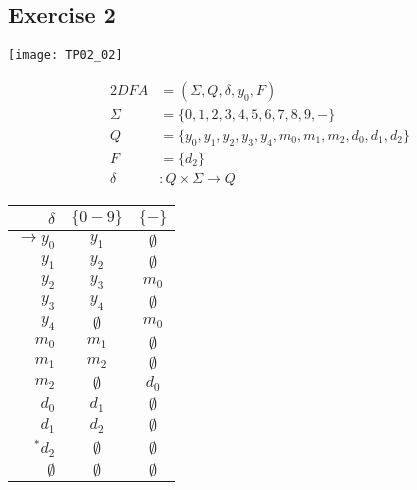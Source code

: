 {\subsection{Exercise 2}
\begin{center} \texttt{[image: TP02\_02]} \end{center}
\begin{center}
	\begin{minipage}[c]{0.50\textwidth}
		\begin{alignat*}{2}
			DFA    &= (\Sigma, Q, \delta, y_0, F)\\
			\Sigma &= \{0,1,2,3,4,5,6,7,8,9,-\}\\
			Q      &= \{y_0,y_1,y_2,y_3,y_4,m_0,m_1,m_2,d_0,d_1,d_2\}\\
			F      &= \{d_2\}\\
			\delta &\colon Q \times \Sigma \rightarrow Q
		\end{alignat*}
	\end{minipage}
	\begin{minipage}[c]{0.3\textwidth}
		\begin{center}
		\begin{tabular}{ r | c c }
 			$\delta$ & $\{0-9\}$ & $\{-\}$ \\ \hline
 			$\rightarrow y_0$ & $y_1      $ & $\emptyset$ \\  
 			$            y_1$ & $y_2      $ & $\emptyset$ \\
 			$            y_2$ & $y_3      $ & $m_0      $ \\
 			$            y_3$ & $y_4      $ & $\emptyset$ \\
 			$            y_4$ & $\emptyset$ & $m_0      $ \\
 			$            m_0$ & $m_1      $ & $\emptyset$ \\
 			$            m_1$ & $m_2      $ & $\emptyset$ \\
 			$            m_2$ & $\emptyset$ & $d_0      $ \\
 			$            d_0$ & $d_1      $ & $\emptyset$ \\
 			$            d_1$ & $d_2      $ & $\emptyset$ \\
 			$      ^\ast d_2$ & $\emptyset$ & $\emptyset$ \\
 			$\emptyset      $ & $\emptyset$ & $\emptyset$
		\end{tabular}
		\end{center}
	\end{minipage}
\end{center}
\pagebreak
}
